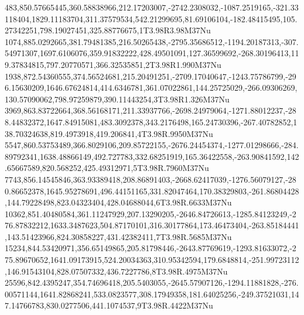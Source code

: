 483,850.57665445,360.58838966,212.17203007,-2742.2308032,-1087.2519165,-321.33118404,1829.11183704,311.37579534,542.21299695,81.69106104,-182.48415495,105.27342251,798.19027451,325.88776675,1T3.98R3.98M37Nu
1074,885.0292665,381.79481385,216.50265438,-2795.35686512,-1194.20187313,-307.54971307,1697.6106076,359.91832222,428.49501091,127.36599692,-268.30196413,119.37834815,797.20770571,366.32535851,2T3.98R1.990M37Nu
1938,872.54360555,374.56524681,215.20491251,-2709.17040647,-1243.75786799,-296.15630209,1646.67624814,414.6346781,361.07022861,144.25725029,-266.09306269,130.57090062,798.97259879,390.11443254,3T3.98R1.326M37Nu
3969,863.83722664,368.56168171,211.33937766,-2698.24979064,-1271.88012237,-288.44832372,1647.84915081,483.3092378,343.2176498,165.24730396,-267.40782852,138.70324638,819.4973918,419.206841,4T3.98R.9950M37Nu
5547,860.53753489,366.8029106,209.85722155,-2676.24454374,-1277.01298666,-284.89792341,1638.48866149,492.727783,332.68251919,165.36422558,-263.90841592,142.65667589,820.568252,425.49312971,5T3.98R.7960M37Nu
7743,856.14545846,363.93389418,208.86891403,-2668.62417039,-1276.56079127,-280.86652378,1645.95278691,496.44151165,331.82047464,170.38329803,-261.86804428,144.79228498,823.04323404,428.04688044,6T3.98R.6633M37Nu
10362,851.40480584,361.11247929,207.13290205,-2646.84726613,-1285.84123249,-276.87832212,1633.3487623,504.87170101,316.30177864,173.46473404,-263.85184441,143.51423966,824.30858227,431.42382411,7T3.98R.5685M37Nu
15234,844.53420971,356.65149865,205.81798446,-2643.87769619,-1293.81633072,-275.89670652,1641.09173915,524.20034363,310.95342594,179.6848814,-251.99723112,146.91543104,828.07507332,436.7227786,8T3.98R.4975M37Nu
25596,842.4395247,354.74696418,205.5403055,-2645.57907126,-1294.11881828,-276.00571144,1641.82868241,533.0823577,308.17949358,181.64025256,-249.37521031,147.14766783,830.0277506,441.1074537,9T3.98R.4422M37Nu
